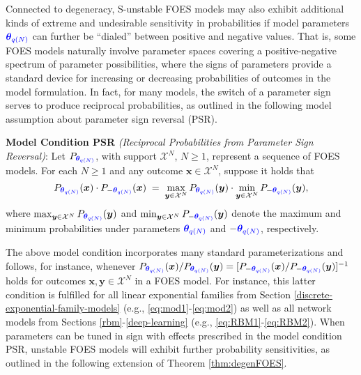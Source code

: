 \documentclass[numbib]{imamat}
\theoremstyle{theorem}
\theoremstyle{lemma}
\theoremstyle{example}
\theoremstyle{corollary}
\theoremstyle{definition}
\theoremstyle{remark}
\theoremstyle{approximation}
\theoremstyle{scheme}
\newcommand{\thetaidx}{q(N)}
\newcommand{\thetaN}{\boldsymbol \theta_{\thetaidx}}
\newcommand{\ak}[1]{{\color{blue} #1}}
\begin{document}
Connected to degeneracy, S-unstable FOES models may also exhibit additional kinds of extreme and undesirable sensitivity in probabilities if model parameters \(\ak{\thetaN}\) can further be ``dialed'' between positive and negative values. That is, some FOES models naturally involve parameter spaces covering a positive-negative spectrum of parameter possibilities, where the signs of parameters provide a standard device for increasing or decreasing probabilities of outcomes in the model formulation. In fact, for many models, the switch of a parameter sign serves to produce reciprocal probabilities, as outlined in the following model assumption about parameter sign reversal (PSR).

\textbf{Model Condition PSR} \emph{(Reciprocal Probabilities from Parameter Sign Reversal)}: Let \(P_{\ak{\thetaN}}\), with support \(\mathcal{X}^N\), \(N\geq 1\), represent a sequence of FOES models. For each \(N \geq 1\) and any outcome \(\boldsymbol x \in \mathcal{X}^N\), suppose it holds that
\[
P_{\ak{\thetaN}}(\boldsymbol x)  \cdot P_{-\ak{\thetaN}}(\boldsymbol x) \;=\;   \max\limits_{\boldsymbol y \in \mathcal{X}^N}P_{ \ak{\thetaN}}(\boldsymbol y)\cdot \min\limits_{\boldsymbol y \in \mathcal{X}^N}P_{-\ak{\thetaN}}(\boldsymbol y),
\]
where \(\max_{\boldsymbol y \in \mathcal{X}^N}P_{\ak{\thetaN}}(\boldsymbol y)\) and \(\min_{\boldsymbol y \in \mathcal{X}^N}P_{-\ak{\thetaN}}(\boldsymbol y)\) denote the maximum and minimum probabilities under parameters \(\ak{\thetaN}\) and \(-\ak{\thetaN}\), respectively.

The above model condition incorporates many standard parameterizations and follows, for instance, whenever \(P_{\ak{\thetaN}}(\boldsymbol x)/P_{\ak{\thetaN}}(\boldsymbol y) = [P_{-\ak{\thetaN}}(\boldsymbol x)/P_{-\ak{\thetaN}}(\boldsymbol y)]^{-1}\) holds for outcomes \(\boldsymbol x, \boldsymbol y \in\mathcal{X}^N\) in a FOES model. For instance, this latter condition is fulfilled for all linear exponential families from Section \ref{discrete-exponential-family-models} (e.g., \eqref{eq:mod1}-\eqref{eq:mod2}) as well as all network models from Sections \ref{rbm}-\ref{deep-learning} (e.g., \eqref{eq:RBM1}-\eqref{eq:RBM2}). When parameters can be tuned in sign with effects prescribed in the model condition PSR, unstable FOES models will exhibit further probability sensitivities, as outlined in the following extension of Theorem \ref{thm:degenFOES}.
\end{document}

